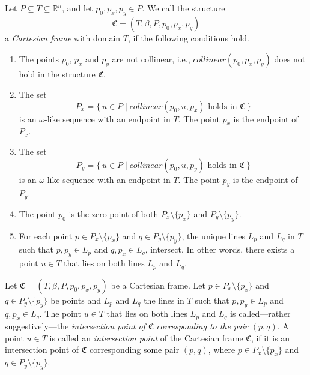 \documentclass{LMCS}
\theoremstyle{plain}
\newcommand{\rsq}{\mathbb{R}^n}
\newcommand{\mf}{\mathfrak}
\newcommand{\mi}{\mathit}
\begin{document}
%
% 
%
%
%
%
\begin{defi}
%
%
%
Let $P\subseteq T\subseteq \rsq$, and let $p_0,p_x,p_y\in P$. We call the structure
%
%
%
$$\mf{C}=(T,\beta,P,p_0,p_x,p_y)$$
%
%
%
a \emph{Cartesian frame} with domain $T$, if the following conditions hold.
%
\begin{enumerate}
%
\item The points $p_0$, $p_x$ and $p_y$ are not collinear, i.e., $\mi{collinear}(p_0,p_x,p_y)$ does not hold
%
in the structure $\mf{C}$.
%
\item
The set 
%
%
%
$$P_x=\{\ u\in P\mid \mi{collinear}(p_0,u,p_x) \text{ holds in }\mf{C}\ \}$$
%
%
%
is an $\omega$-like sequence with an
%
endpoint in $T$. The point $p_x$ is the endpoint of $P_x$.
%
\item
The set
%
%
%
$$P_y=\{\ u\in P\mid \mi{collinear}(p_0,u,p_y)\text{ holds in }\mf{C}\ \}$$
%
%
%
is an $\omega$-like sequence with an
%
endpoint in $T$. The point $p_y$ is the endpoint of $P_y$.
%
\item The point $p_0$ is the zero-point of both $P_x\setminus\{p_x\}$ and $P_y\setminus\{p_y\}$.
% 
\item For each point $p\in P_x\setminus\{p_x\}$ and $q\in P_y\setminus\{p_
y\}$, the unique lines $L_p$ and $L_q$ in $T$ such
%
that $p,p_y\in L_p$ and $q,p_x\in L_q$, intersect. In other words, there exists a point $u\in T$
% 
that lies on both lines $L_p$ and $L_q$.
%
\end{enumerate}
%
%
%
\end{defi}
%



%
\begin{defi}\label{intersectionpointdefinition}
%
Let $\mf{C}=(T,\beta,P,p_0,p_x,p_y)$ be a Cartesian frame. 
%
Let $p\in P_x\setminus\{p_x\}$ and $q\in P_y\setminus\{p_y\}$
%
be points and $L_p$ and $L_q$ the lines in $T$ such that $p,p_y\in L_p$ and $q,p_x\in L_q$.
%
The point $u\in T$ that lies on both lines $L_p$ and $L_q$ is called---rather suggestively---the
%
\emph{intersection point of $\mf{C}$ corresponding to the pair $(p,q)$}. A point $u\in T$ is called an \emph{intersection point} of the Cartesian
%
 frame $\mf{C}$, if it is an intersection point of $\mf{C}$ corresponding some pair $(p,q)$, where $p\in P_x\setminus\{p_x\}$ and $q\in
%
 P_y\setminus\{p_y\}$.
%
\end{defi}
%
\end{document}
